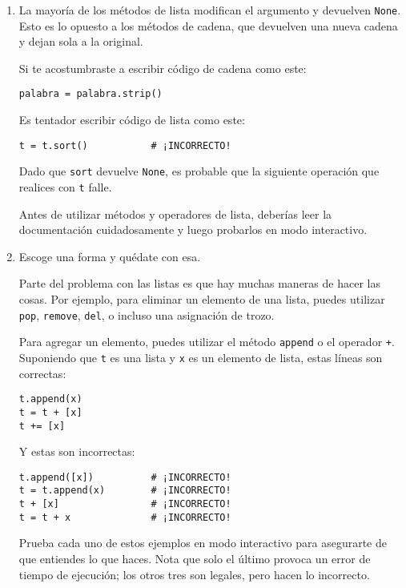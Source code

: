 \documentclass[10pt]{book}
\begin{document}
\begin{enumerate}

\item La mayoría de los métodos de lista modifican el argumento y
  devuelven {\tt None}.  Esto es lo opuesto a los métodos de cadena,
  que devuelven una nueva cadena y dejan sola a la original.

Si te acostumbraste a escribir código de cadena como este:

\begin{verbatim}
palabra = palabra.strip()
\end{verbatim}

Es tentador escribir código de lista como este:

\begin{verbatim}
t = t.sort()           # ¡INCORRECTO!
\end{verbatim}

Dado que {\tt sort} devuelve {\tt None}, es probable que la
siguiente operación que realices con {\tt t} falle.

Antes de utilizar métodos y operadores de lista, deberías leer la
documentación cuidadosamente y luego probarlos en modo interactivo.

\item Escoge una forma y quédate con esa.

Parte del problema con las listas es que hay muchas
maneras de hacer las cosas.  Por ejemplo, para eliminar un elemento de
una lista, puedes utilizar {\tt pop}, {\tt remove}, {\tt del},
o incluso una asignación de trozo.

Para agregar un elemento, puedes utilizar el método {\tt append} o
el operador {\tt +}.  Suponiendo que {\tt t} es una lista y
{\tt x} es un elemento de lista, estas líneas son correctas:

\begin{verbatim}
t.append(x)
t = t + [x]
t += [x]
\end{verbatim}

Y estas son incorrectas:

\begin{verbatim}
t.append([x])          # ¡INCORRECTO!
t = t.append(x)        # ¡INCORRECTO!
t + [x]                # ¡INCORRECTO!
t = t + x              # ¡INCORRECTO!
\end{verbatim}

Prueba cada uno de estos ejemplos en modo interactivo para asegurarte
de que entiendes lo que haces.  Nota que solo el último
provoca un error de tiempo de ejecución; los otros tres son legales, pero
hacen lo incorrecto.



\end{enumerate}
\end{document}
